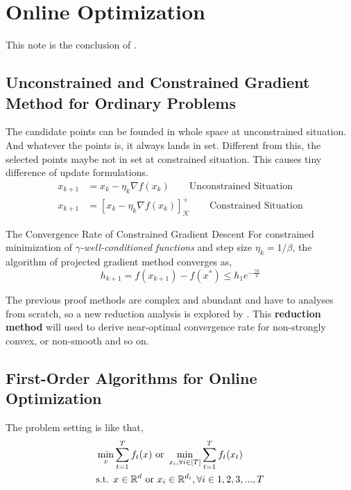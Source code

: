 \ifx\allfiles\undefined


	\else
	\fi
	\chapter{Online Optimization} 
	
	This note is the conclusion of \cite{hazan2023introductiononlineconvexoptimization}.
	
	\section{Unconstrained and Constrained Gradient Method for Ordinary Problems}
		The candidate points can be founded in whole space at unconstrained situation. And whatever the points is, it always lands in set. Different from this, the selected points maybe not in set at constrained situation. This causes tiny difference of update formulations.
		\begin{equation*}
			\begin{split}
				x_{k+1} &= x_k -\eta_k \nabla f(x_k) \quad \quad \text{Unconstrained Situation} \\
				x_{k+1} &= [x_k -\eta_k \nabla f(x_k)]_{\mathcal{K}}^+ \quad \quad \text{Constrained Situation}
			\end{split}
		\end{equation*}
		
		\begin{Properties}{The Convergence Rate of Constrained Gradient Descent}{}
			For constrained minimization of $\gamma$\emph{-well-conditioned functions} and step size $\eta_k=1/\beta$, the algorithm of projected gradient method converges as,
			$$
			h_{k+1} = f(x_{k+1})-f(x^*)\le h_1 e^{-\frac{\gamma k}{4}}
			$$
		\end{Properties}
		
		The previous proof methods are complex and abundant and have to analyses from scratch, so a new reduction analysis is explored by \cite{}. This \textbf{reduction method} will used to derive near-optimal convergence rate for non-strongly convex, or non-smooth and so on.
		
	\section{First-Order Algorithms for Online Optimization}
		The problem setting is like that,
		\begin{equation*}
			\begin{split}
				&\min_x \sum_{t=1}^T f_t(x) \text{ or } \min_{x_i,\forall i\in[T]} \sum_{t=1}^T f_t(x_t) \\
				&\text{s.t. } x\in \mathbb{R}^d \text{ or } x_i\in\mathbb{R}^{d_i},\forall i \in {1,2,3,...,T}
			\end{split}
		\end{equation*}
